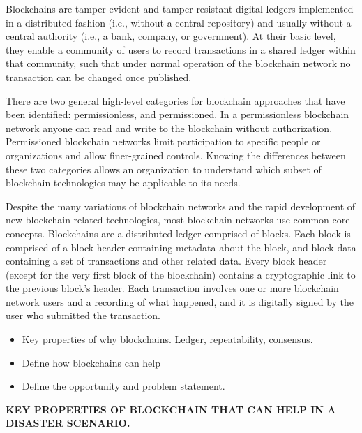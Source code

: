 Blockchains are tamper evident and tamper resistant digital ledgers implemented
in a distributed fashion (i.e., without a central repository) and usually
without a central authority (i.e., a bank, company, or government). At their
basic level, they enable a community of users to record transactions in a
shared ledger within that community, such that under normal operation of the
blockchain network no transaction can be changed once published.

There are two general high-level categories for blockchain approaches that have
been identified: permissionless, and permissioned. In a permissionless
blockchain network anyone can read and write to the blockchain without
authorization. Permissioned blockchain networks limit participation to specific
people or organizations and allow finer-grained controls. Knowing the
differences between these two categories allows an organization to understand
which subset of blockchain technologies may be applicable to its needs.

Despite the many variations of blockchain networks and the rapid development of
new blockchain related technologies, most blockchain networks use common core
concepts.  Blockchains are a distributed ledger comprised of blocks. Each block
is comprised of a block header containing metadata about the block, and block
data containing a set of transactions and other related data. Every block
header (except for the very first block of the blockchain) contains a
cryptographic link to the previous block’s header. Each transaction involves
one or more blockchain network users and a recording of what happened, and it
is digitally signed by the user who submitted the transaction.


\begin{itemize}
\item Key properties of why blockchains. Ledger, repeatability, consensus.
\item Define how blockchains can help
\item Define the opportunity and problem statement.
\end{itemize}

{\bf KEY PROPERTIES OF BLOCKCHAIN THAT CAN HELP IN A DISASTER SCENARIO.}

